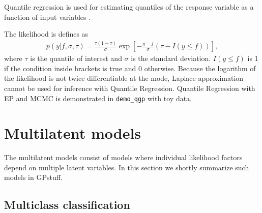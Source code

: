 \documentclass[twoside,11pt]{article}
\newcommand{\code}[1]{{\normalfont\texttt{#1}}}
\begin{document}
Quantile regression is used for estimating quantiles of the response
variable as a function of input variables \citep{Boukouvalas:2012}.

The likelihood is defines as
\begin{align}
p(y | f, \sigma, \tau) = \frac{\tau(1-\tau)}{\sigma}\exp\left[-\frac{y-f}{\sigma}(\tau - I(y \le f))\right],
\end{align}
where $\tau$ is the quantile of interest and $\sigma$ is the standard
deviation. $I(y \le f)$ is 1 if the condition inside brackets is true
and 0 otherwise. Because the logarithm of the likelihood is not twice
differentiable at the mode, Laplace approximation cannot be used for
inference with Quantile Regression. Quantile Regression with EP and
MCMC is demonstrated in \code{demo\_qgp} with toy data.

%    
%
%
%


\section{Multilatent models}
\label{sec:multilatent-models}

The multilatent models consist of models where individual likelihood
factors depend on multiple latent variables. In this section we
shortly summarize such models in GPstuff.

\subsection{Multiclass classification}
\end{document}
